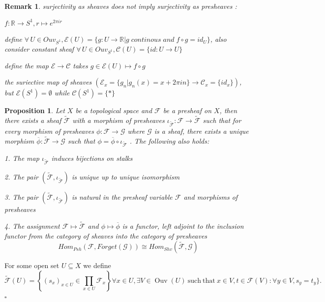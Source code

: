 \documentclass{article}
\newtheorem{proposition}[theorem]{Proposition}
\newtheorem{remark}[theorem]{Remark}
\newenvironment{Proof}{{\noindent \indent \it Proof:\quad}}{\hfill $\square$\par}
\begin{document}
\begin{remark}
    surjectivity as sheaves does not imply surjectivity as presheaves :

    $f:\mathbb R\to S^1, r\mapsto e^{2\pi ir}$

    define $\forall\, U\in Ouv_{S^1},\mathcal E(U)=\{g:U\to \mathbb R|g\;continous\;and\;f\circ g=id_U\}$, also consider constant sheaf $\forall\, U\in Ouv_{S^1},\mathcal C(U)=\{id:U\to U\}$

    define the map $\mathcal E\to\mathcal C$ takes $g\in\mathcal E(U)\mapsto f\circ g$

    the suriective map of sheaves $(\mathcal E_x=\{g_n|g_n(x)=x+2\pi in\} \to \mathcal C_x=\{id_x\})$,
    but $\mathcal E(S^1)=\emptyset$ while $\mathcal C(S^1)=\{\ast\}$
\end{remark}
\begin{proposition}
    Let $X$ be a topological space and $\mathcal F$ be a presheaf on $X$, then there exists a sheaf $\widetilde{\mathcal F}$ with a morphism of presheaves $\iota_{\widetilde{\mathcal F}}:{\mathcal F} \rightarrow\widetilde{\mathcal F}$ such that for every morphism of presheaves $\phi:{\mathcal{F}} \rightarrow{\mathcal{G}}$ where $\mathcal{G}$ is a sheaf, there exists a unique morphism $\overline{\phi}:\widetilde{\mathcal F} \rightarrow\mathcal{G}$ such that $\phi=\overline{\phi}\circ\iota_{\widetilde{\mathcal F}}$ . The following also holds:
    
1. The map $\iota_{\widetilde{\mathcal F}}$ induces bijections on stalks

2. The pair $(\widetilde{\mathcal F},\iota_{\widetilde{\mathcal F}})$ is unique up to unique isomorphism

3. The pair $(\widetilde{\mathcal F},\iota_{\widetilde{\mathcal F}})$ is natural in the presheaf variable $\mathcal F$ and morphisms of presheaves

4. The assignment ${\mathcal{F}}\mapsto{\widetilde{\mathcal F}}$ and $\phi\mapsto{\overline{{\phi}}}$ is a functor, left adjoint to the inclusion functor from the category of sheaves into the category of presheaves
$$
Hom_{Psh}(\mathcal F,Forget(\mathcal G))\cong
Hom_{Shv}(\widetilde{\mathcal F},\mathcal G)
$$
\end{proposition}
\begin{Proof}
    For some open set $U\subseteq X$ we define
$$
{\widetilde{\mathcal{F}}}(U)=\left\{(s_{x})_{x\in U}\in\prod_{x\in U}{\mathcal{F}}_{x}\right\}\forall x\in U,\exists V\in\operatorname{Ouv}(U){\mathrm{~such~that~}}x\in V,t\in{\mathcal{F}}(V):\forall y\in V,s_{y}=t_{y} \}. 
$$
\end{Proof}
\end{document}
